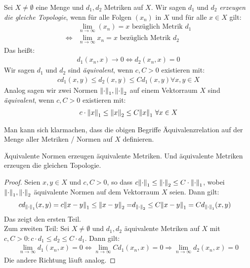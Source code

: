 \begin{Definition}{%
Sei $X \neq \emptyset$ eine Menge und $d_1,d_2$ Metriken auf $X$. 
Wir sagen $d_1$ und $d_2$ \emph{erzeugen die gleiche Topologie}, wenn für alle 
Folgen $(x_n)$ in $X$ und für alle $x\in X$ gilt:
\begin{align*}
	& \lim\limits_{n \rightarrow \infty}{(x_n)} = x \text{ bezüglich Metrik } d_1\\
	\Leftrightarrow & \lim\limits_{n \rightarrow \infty}{ x_n = x }\text{ bezüglich 
		Metrik } d_2
\end{align*}
Das heißt: 
\begin{align*}
	d_1(x_n,x) \rightarrow 0 \Leftrightarrow d_2(x_n,x) = 0
\end{align*}
Wir sagen $d_1$ und $d_2$ sind \emph{äquivalent}, wenn $c,C > 0$ existieren mit:
\begin{align*}
	c d_1(x,y) \leq d_2(x,y) \leq C d_1(x,y) \forall x,y \in X
\end{align*}
Analog sagen wir zwei Normen $\norm{\cdot}_1, \norm{\cdot}_2$ auf einem Vektorraum 
$X$ sind \emph{äquivalent}, wenn $c,C > 0$ existieren mit:
\begin{align*}
	c \cdot \norm{x}_1 \leq \norm{x}_2 \leq C \norm{x}_1 \text{ } \forall x \in X
\end{align*}
}\end{Definition}

\begin{Bemerkung}{
	Man kann sich klarmachen, dass die obigen Begriffe Äquivalenzrelation auf der 
	Menge aller Metriken / Normen auf $X$ definieren.
}\end{Bemerkung}

\begin{Proposition}{%
	Äquivalente Normen erzeugen äquivalente Metriken. Und äquivalente Metriken 
	erzeugen die gleichen Topologie.
}\end{Proposition}

\begin{proof}
	Seien $x,y \in X$ und $c,C > 0$, so dass $c \norm{\cdot}_1 \leq \norm{\cdot}_2 
	\leq C \cdot \norm{\cdot}_1$, wobei $\norm{\cdot}_1, \norm{\cdot}_2$ 
	äquivalente Normen auf dem Vektorraum $X$ seien.
	Dann gilt:
	\begin{align*}
		c d_{\norm{\cdot}_1}(x,y) = c \norm{x-y}_1 \leq \norm{x-y}_2 
		= & d_{\norm{\cdot}_2} \leq C \norm{x-y}_1 = C d_{\norm{\cdot}_1}(x,y)
	\end{align*}
	Das zeigt den ersten Teil.\\
	Zum zweiten Teil: Sei $X \neq \emptyset$ und $d_1,d_2$ äquivalente Metriken auf 
	$X$ mit \\$c,C > 0: c\cdot d_1  \leq d_2 \leq C\cdot d_1$.
	Dann gilt: 
	\begin{align*}
		\lim\limits_{n \rightarrow \infty}{d_1(x_n,x) = 0} \Leftrightarrow 
		\lim\limits_{n\rightarrow\infty}{C d_1(x_n,x) = 0}
		\Rightarrow \lim\limits_{n \rightarrow \infty}{d_2(x_n,x) = 0}
	\end{align*}
	Die andere Richtung läuft analog.
\end{proof}

